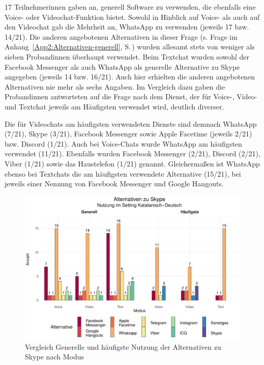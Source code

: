 17 Teilnehmer{\textperiodcentered}innen gaben an, generell Software zu verwenden, die ebenfalls eine Voice- oder Videochat-Funktion bietet. Sowohl in Hinblick auf Voice- als auch auf den Videochat gab die Mehrheit an, WhatsApp zu verwenden (jeweils 17 bzw. 14/21). Die anderen angebotenen Alternativen in dieser Frage (s. Frage im Anhang~\ref{App2:Alternativen-generell}, S.\,\pageref{App2:Alternativen-generell}) wurden allesamt stets von weniger als sieben Proband{\textperiodcentered}innen überhaupt verwendet. Beim Textchat wurden sowohl der Facebook Messenger als auch WhatsApp als generelle Alternative zu Skype angegeben (jeweils 14 bzw. 16/21). Auch hier erhielten die anderen angebotenen Alternativen nie mehr als sechs Angaben. Im Vergleich dazu gaben die Proband{\textperiodcentered}innen antworteten auf die Frage nach dem Dienst, der für Voice-, Video- und Textchat jeweils am Häufigsten verwendet wird, deutlich diverser.

Die für Videochats am häufigsten verwendeten Dienste sind demnach WhatsApp (7/21), Skype (3/21), Facebook Messenger sowie Apple Facetime (jeweils 2/21) bzw. Discord (1/21). Auch bei Voice-Chats wurde WhatsApp am häufigsten verwendet (11/21). Ebenfalls wurden Facebook Messenger (2/21), Discord (2/21), Viber (1/21) sowie das Haustelefon (1/21) genannt. Gleichermaßen ist WhatsApp ebenso bei Textchats die am häufigsten verwendete Alternative (15/21), bei jeweils einer Nennung von Facebook Messenger und Google Hangouts.


\begin{figure}
    \includegraphics[width=\textwidth]{Figures/EingangsFB/ggplot_skype_Nutzungsvergleich_Alternativen-CatDe}
	\caption{Vergleich Generelle und häufigste Nutzung der Alternativen zu Skype nach Modus}
    \label{K6:fig:NutzungsVgl-Alternativen-Modus-CatDe}
\end{figure}

